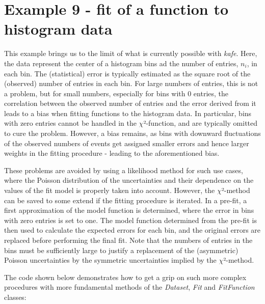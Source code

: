 \documentclass[a4paper,10pt,english]{sphinxmanual}
\begin{document}
\section{Example 9 - fit of a function to histogram data}
\label{examples:example-9-fit-of-a-function-to-histogram-data}
This example brings us to the limit of what is currently
possible with \emph{kafe}. Here, the data represent the
center of a histogram bins ad the number of entries, \(n_i\),
in each bin. The (statistical) error is typically estimated
as the square root of the (observed) number of entries in each bin.
For large numbers of entries, this is not a problem,
but for small numbers, especially for bins with 0 entries,
the correlation between the observed number of entries and
the error derived from it leads to a bias when fitting
functions to the histogram data. In particular, bins with
zero entries cannot be handled in the \(\chi\)²-function, and are
typically omitted to cure the problem.  However, a bias
remains, as bins with downward fluctuations of the
observed numbers of events get assigned smaller errors
and hence larger weights in the fitting procedure - leading
to the aforementioned bias.

These problems are avoided by using a likelihood method for
such use cases, where the Poisson distribution of the uncertainties
and their dependence on the values of the fit model is properly
taken into account. However, the \(\chi\)²-method can be saved to some
extend if the fitting procedure is iterated. In a pre-fit, a
first approximation of the model function is determined, where
the error in bins with zero entries is set to one. The model
function determined from the pre-fit is then used to calculate
the expected errors for each bin, and the original errors are
replaced before performing the final fit. Note that the numbers
of entries in the bins must be sufficiently large to justify
a replacement of the (asymmetric) Poisson uncertainties by
the symmetric uncertainties implied by the \(\chi\)²-method.

The code shown below demonstrates
how to get a grip on such more complex procedures with
more fundamental methods of the \emph{Dataset}, \emph{Fit} and
\emph{FitFunction} classes:
\end{document}
